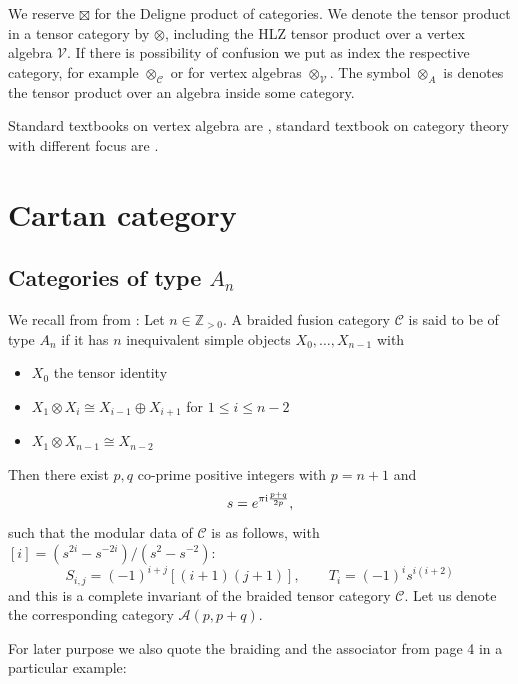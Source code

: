 \documentclass[a4paper, reqno]{amsart}
\theoremstyle{introTheorems}
\newcommand\cA{\mathcal{A}}
\newcommand\cC{\mathcal{C}}
\renewcommand{\1}{\mathbbold{1}}
\begin{document}
We reserve $\boxtimes$ for the Deligne  product of categories. We denote the tensor product in a tensor category by $\otimes$, including the HLZ tensor product over a vertex algebra $\mathcal{V}$. If there is possibility of confusion we put as index the respective category, for example $\otimes_\cC$ or for vertex algebras $\otimes_{\mathcal{V}}$. The symbol $\otimes_A$ is denotes the tensor product over an algebra inside some category. 

Standard textbooks on vertex algebra are \cites{Kac97,FBZ04}, standard textbook on category theory with different focus are  \cites{EGNO15,Riehl16,Walton24}.



\section{Cartan category}\label{sec:Cartan}

\subsection{Categories of type \texorpdfstring{$A_n$}{An}}\label{subsec:CartanAn}

We recall from from \cites{FK93,CM}: 
Let $n \in \mathbb Z_{>0}$. A braided fusion category $\mathcal C$ is said to be of type $A_n$ if it has $n$ inequivalent simple objects $X_0, \dots, X_{n-1}$ with 
\begin{itemize}
    \item  $X_0$ the tensor identity
    \item $X_1 \otimes X_i \cong X_{i-1} \oplus X_{i+1}$ for $1 \leq  i  \leq n-2$
    \item $X_1 \otimes X_{n-1} \cong X_{n-2}$
\end{itemize}
Then there exist  $p, q$  co-prime positive integers with  $p= n+1$ and 
\[
s = e^{\pi \mathrm{i} \frac{p+q}{2p}},
\]
such that the modular data of $\mathcal C$ is as follows, with 
$[i] = (s^{2i} - s^{-2i})/(s^2 - s^{-2})$:
\[
S_{i, j} = (-1)^{i+j}[(i+1)(j+1)], \qquad T_i = (-1)^i s^{i(i+2)}
\]
and this is a complete invariant of the braided tensor category $\mathcal C$. Let us denote the corresponding category $\cA(p, p+q)$. 

For later purpose we also quote the braiding and the associator from \cite{CM} page 4 in a particular example:
\end{document}
